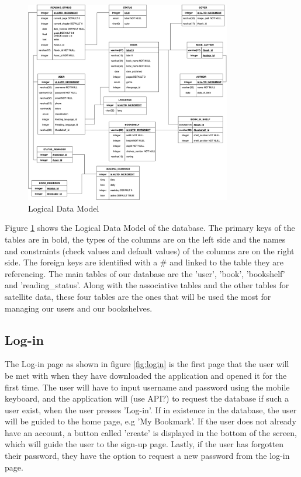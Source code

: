 \documentclass[conference]{IEEEtran}
\begin{document}
\begin{figure}[h]
    \centering
    \includegraphics[width=9cm]{Ressources/Specifications/LDM.png}
    \caption{Logical Data Model\cite{LDM}}
    \label{fig:ldm}
\end{figure}

Figure \ref{fig:ldm} shows the Logical Data Model of the database. The primary keys of the tables are in bold, the types of the columns are on the left side and the names and constraints (check values and default values) of the columns are on the right side. The foreign keys are identified with a \# and linked to the table they are referencing.
The main tables of our database are the 'user', 'book', 'bookshelf' and 'reading\_status'. Along with the associative tables and the other tables for satellite data, these four tables are the ones that will be used the most for managing our users and our bookshelves.

\subsection{Log-in}

The Log-in page as shown in figure \ref{fig:login} is the first page that the user will be met with when they have downloaded the application and opened it for the first time. The user will have to input username and password using the mobile keyboard, and the application will (use API?) to request the database if such a user exist, when the user presses 'Log-in'. If in existence in the database, the user will be guided to the home page, e.g 'My Bookmark'. If the user does not already have an account, a button called 'create' is displayed in the bottom of the screen, which will guide the user to the sign-up page. Lastly, if the user has forgotten their password, they have the option to request a new password from the log-in page.
\end{document}
